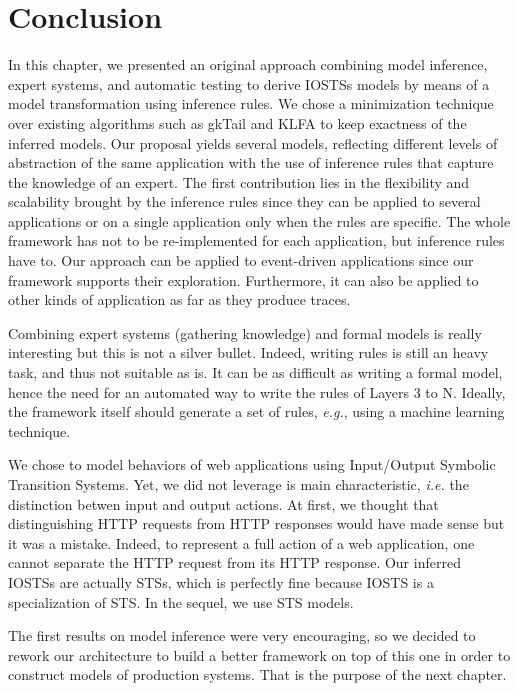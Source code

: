 \section{Conclusion}
\label{sec:modelinf:webapps:conclusion}

In this chapter, we presented an original approach combining
model inference, expert systems, and automatic testing to derive
IOSTSs models by means of a model transformation using inference
rules.  We chose a minimization technique over existing
algorithms such as gkTail and KLFA to keep exactness of the
inferred models. Our proposal yields several models, reflecting
different levels of abstraction of the same application with the
use of inference rules that capture the knowledge of an expert.
The first contribution lies in the flexibility and scalability
brought by the inference rules since they can be applied to
several applications or on a single application only when the
rules are specific. The whole framework has not to be
re-implemented for each application, but inference rules have to.
Our approach can be applied to event-driven applications since
our framework supports their exploration. Furthermore, it can
also be applied to other kinds of application as far as they
produce traces.

Combining expert systems (gathering knowledge) and formal models
is really interesting but this is not a silver bullet. Indeed,
writing rules is still an heavy task, and thus not suitable as
is. It can be as difficult as writing a formal model, hence the
need for an automated way to write the rules of Layers 3 to N.
Ideally, the framework itself should generate a set of rules,
\emph{e.g.}, using a machine learning technique.

We chose to model behaviors of web applications using
Input/Output Symbolic Transition Systems. Yet, we did not
leverage is main characteristic, \emph{i.e.} the distinction
betwen input and output actions. At first, we thought that
distinguishing HTTP requests from HTTP responses would have made
sense but it was a mistake. Indeed, to represent a full action of
a web application, one cannot separate the HTTP request from its
HTTP response. Our inferred IOSTSs are actually STSs, which is
perfectly fine because IOSTS is a specialization of STS. In the
sequel, we use STS models.

The first results on model inference were very encouraging, so we
decided to rework our architecture to build a better framework on
top of this one in order to construct models of production
systems. That is the purpose of the next chapter.

